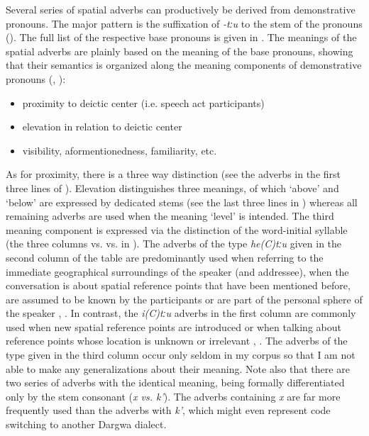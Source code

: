 Several series of spatial adverbs can productively be derived from demonstrative pronouns. The major  pattern is the suffixation of \textit{-tːu} to the stem of the pronouns (). The full list of the respective base pronouns is given in . The meanings of the spatial adverbs are plainly based on the meaning of the base pronouns, showing that their semantics is organized along the meaning components of demonstrative pronouns (, ):   
\begin{itemize}
	\item	proximity to deictic center (i.e. speech act participants)
	\item	elevation in relation to deictic center
	\item	visibility, aformentionedness, familiarity, etc.
\end{itemize}
As for proximity, there is a three way distinction (see the adverbs in the first three lines of ). Elevation distinguishes three meanings, of which `above' and `below' are expressed by dedicated stems (see the last three lines in ) whereas all remaining adverbs are used when the meaning `level' is intended. The third meaning component is expressed via the distinction of the word-initial syllable (the three columns  vs.  vs.  in ). The adverbs of the type \textit{he(C)tːu} given in the second column of the table are predominantly used when referring to the immediate geographical surroundings of the speaker (and addressee), when the conversation is about spatial reference points that have been mentioned before, are assumed to be known by the participants or are part of the personal sphere of the speaker , . In contrast, the \textit{i(C)tːu} adverbs in the first column are commonly used when new spatial reference points are introduced or when talking about reference points whose location is unknown or irrelevant , . The adverbs of the  type given in the third column occur only seldom in my corpus so that I am not able to make any generalizations about their meaning. Note also that there are two series of adverbs with the identical meaning, being formally differentiated only by the stem consonant (\textit{x vs. k'}). The adverbs containing \textit{x} are far more frequently used than the adverbs with \textit{k'}, which might even represent code switching to another Dargwa dialect.
%


